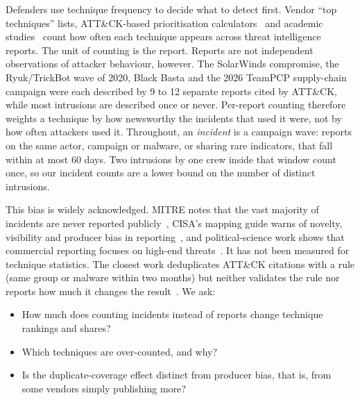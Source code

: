 \documentclass[runningheads]{llncs}
\newcommand{\attack}{ATT\&CK}
\begin{document}
Defenders use technique frequency to decide what to detect first. Vendor ``top techniques'' lists, \attack{}-based prioritisation calculators~\cite{ctid2022top} and academic studies~\cite{rahman2024arsenal} count how often each technique appears across threat intelligence reports. The unit of counting is the report. Reports are not independent observations of attacker behaviour, however. The SolarWinds compromise, the Ryuk/TrickBot wave of 2020, Black Basta and the 2026 TeamPCP supply-chain campaign were each described by 9 to 12 separate reports cited by \attack{}, while most intrusions are described once or never. Per-report counting therefore weights a technique by how newsworthy the incidents that used it were, not by how often attackers used it. Throughout, an \emph{incident} is a campaign wave: reports on the same actor, campaign or malware, or sharing rare indicators, that fall within at most 60 days. Two intrusions by one crew inside that window count once, so our incident counts are a lower bound on the number of distinct intrusions.

This bias is widely acknowledged. MITRE notes that the vast majority of incidents are never reported publicly~\cite{strom2020attack}, CISA's mapping guide warns of novelty, visibility and producer bias in reporting~\cite{cisa2023mapping}, and political-science work shows that commercial reporting focuses on high-end threats~\cite{maschmeyer2021tale}. It has not been measured for technique statistics. The closest work deduplicates \attack{} citations with a rule (same group or malware within two months) but neither validates the rule nor reports how much it changes the result~\cite{rahman2024arsenal}. We ask:

\begin{itemize}
\item[\textbf{RQ1}] How much does counting incidents instead of reports change technique rankings and shares?
\item[\textbf{RQ2}] Which techniques are over-counted, and why?
\item[\textbf{RQ3}] Is the duplicate-coverage effect distinct from producer bias, that is, from some vendors simply publishing more?
\end{itemize}
\end{document}
